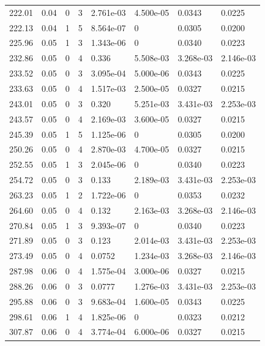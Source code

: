 \documentclass[preview]{standalone}
\begin{document}
{{{\begin{tabular}{L{1.2cm}C{1.2cm} C{0.3cm}C{0.5cm} C{1.4cm}C{1.4cm} C{1.4cm}C{1.4cm}}
  222.01  &  0.04  & 0     &  3 &  2.761e-03  & 4.500e-05  & 0.0343 &  0.0225   \\ 
  222.13  &  0.04  & 1     &  5 &  8.564e-07  & 0  & 0.0305 &  0.0200   \\ 
  225.96  &  0.05  & 1     &  3 &  1.343e-06  & 0  & 0.0340 &  0.0223   \\ 
  232.86  &  0.05  & 0     &  4 &  0.336  & 5.508e-03  & 3.268e-03 &  2.146e-03   \\ 
  233.52  &  0.05  & 0     &  3 &  3.095e-04  & 5.000e-06  & 0.0343 &  0.0225   \\ 
  233.63  &  0.05  & 0     &  4 &  1.517e-03  & 2.500e-05  & 0.0327 &  0.0215   \\ 
  243.01  &  0.05  & 0     &  3 &  0.320  & 5.251e-03  & 3.431e-03 &  2.253e-03   \\ 
  243.57  &  0.05  & 0     &  4 &  2.169e-03  & 3.600e-05  & 0.0327 &  0.0215   \\ 
  245.39  &  0.05  & 1     &  5 &  1.125e-06  & 0  & 0.0305 &  0.0200   \\ 
  250.26  &  0.05  & 0     &  4 &  2.870e-03  & 4.700e-05  & 0.0327 &  0.0215   \\ 
  252.55  &  0.05  & 1     &  3 &  2.045e-06  & 0  & 0.0340 &  0.0223   \\ 
  254.72  &  0.05  & 0     &  3 &  0.133  & 2.189e-03  & 3.431e-03 &  2.253e-03   \\ 
  263.23  &  0.05  & 1     &  2 &  1.722e-06  & 0  & 0.0353 &  0.0232   \\ 
  264.60  &  0.05  & 0     &  4 &  0.132  & 2.163e-03  & 3.268e-03 &  2.146e-03   \\ 
  270.84  &  0.05  & 1     &  3 &  9.393e-07  & 0  & 0.0340 &  0.0223   \\ 
  271.89  &  0.05  & 0     &  3 &  0.123  & 2.014e-03  & 3.431e-03 &  2.253e-03   \\ 
  273.49  &  0.05  & 0     &  4 &  0.0752  & 1.234e-03  & 3.268e-03 &  2.146e-03   \\ 
  287.98  &  0.06  & 0     &  4 &  1.575e-04  & 3.000e-06  & 0.0327 &  0.0215   \\ 
  288.26  &  0.06  & 0     &  3 &  0.0777  & 1.276e-03  & 3.431e-03 &  2.253e-03   \\ 
  295.88  &  0.06  & 0     &  3 &  9.683e-04  & 1.600e-05  & 0.0343 &  0.0225   \\ 
  298.61  &  0.06  & 1     &  4 &  1.825e-06  & 0  & 0.0323 &  0.0212   \\ 
  307.87  &  0.06  & 0     &  4 &  3.774e-04  & 6.000e-06  & 0.0327 &  0.0215   \\ 

\end{tabular}}}}
\end{document}
